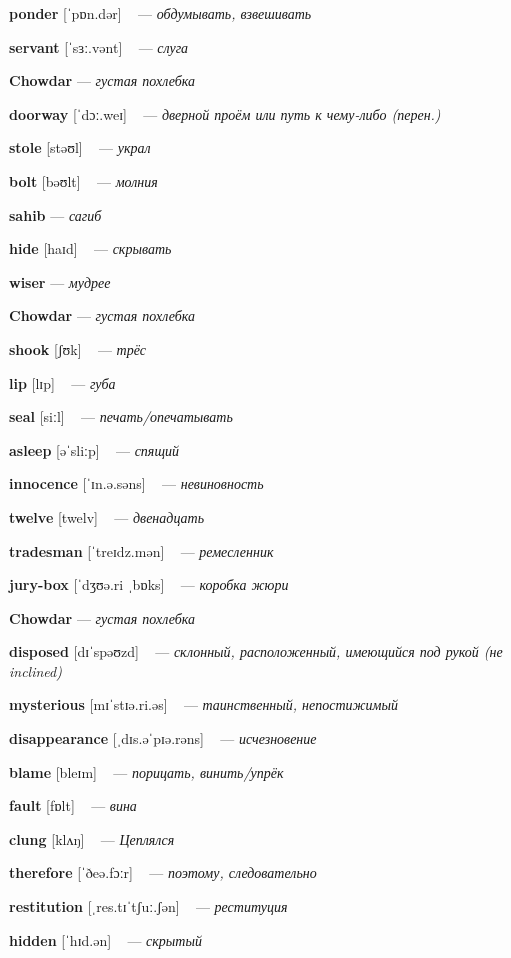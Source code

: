 \documentclass[a4paper,oneside,12pt]{amsart}
\begin{document}
{\large 

 {\bf ponder } [ˈpɒn.dər] ~ --- \emph{ обдумывать, взвешивать }

{\bf servant } [ˈsɜː.vənt] ~ --- \emph{ слуга }

{\bf Chowdar } --- \emph{ густая похлебка }

{\bf doorway } [ˈdɔː.weɪ] ~ --- \emph{ дверной проём или путь к чему-либо (перен.) }

{\bf stole } [stəʊl] ~ --- \emph{ украл }

{\bf bolt } [bəʊlt] ~ --- \emph{ молния }

{\bf sahib } --- \emph{ сагиб }

{\bf hide } [haɪd] ~ --- \emph{ скрывать }

{\bf wiser } --- \emph{ мудрее }

{\bf Chowdar } --- \emph{ густая похлебка }

{\bf shook } [ʃʊk] ~ --- \emph{ трёс }

{\bf lip } [lɪp] ~ --- \emph{ губа }

{\bf seal } [siːl] ~ --- \emph{ печать/опечатывать }

{\bf asleep } [əˈsliːp] ~ --- \emph{ спящий }

{\bf innocence } [ˈɪn.ə.səns] ~ --- \emph{ невиновность }

{\bf twelve } [twelv] ~ --- \emph{ двенадцать }

{\bf tradesman } [ˈtreɪdz.mən] ~ --- \emph{ ремесленник }

{\bf jury-box } [ˈdʒʊə.ri ˌbɒks] ~ --- \emph{ коробка жюри }

{\bf Chowdar } --- \emph{ густая похлебка }

{\bf disposed } [dɪˈspəʊzd] ~ --- \emph{ склонный, расположенный, имеющийся под рукой (не inclined) }

{\bf mysterious } [mɪˈstɪə.ri.əs] ~ --- \emph{ таинственный, непостижимый }

{\bf disappearance } [ˌdɪs.əˈpɪə.rəns] ~ --- \emph{ исчезновение }

{\bf blame } [bleɪm] ~ --- \emph{ порицать, винить/упрёк }

{\bf fault } [fɒlt] ~ --- \emph{ вина }

{\bf clung } [klʌŋ] ~ --- \emph{ Цеплялся }

{\bf therefore } [ˈðeə.fɔːr] ~ --- \emph{ поэтому, следовательно }

{\bf restitution } [ˌres.tɪˈtʃuː.ʃən] ~ --- \emph{ реституция }

{\bf hidden } [ˈhɪd.ən] ~ --- \emph{ скрытый }

}
\end{document}
